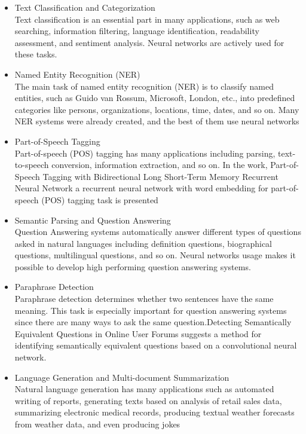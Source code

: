 \documentclass[12pt]{report}
\begin{document}
\begin{itemize}


\item  Text Classification and Categorization\\
Text classification is an essential part in many applications, such as web searching, information filtering, language identification, readability assessment, and sentiment analysis. Neural networks are actively used for these tasks.\\
\item Named Entity Recognition (NER)\\
The main task of named entity recognition (NER) is to classify named entities, such as Guido van Rossum, Microsoft, London, etc., into predefined categories like persons, organizations, locations, time, dates, and so on. Many NER systems were already created, and the best of them use neural networks\\
\item Part-of-Speech Tagging\\
Part-of-speech (POS) tagging has many applications including parsing, text-to-speech conversion, information extraction, and so on. In the work, Part-of-Speech Tagging with Bidirectional Long Short-Term Memory Recurrent Neural Network a recurrent neural network with word embedding for part-of-speech (POS) tagging task is presented \\
\item Semantic Parsing and Question Answering\\
Question Answering systems automatically answer different types of questions asked in natural languages including definition questions, biographical questions, multilingual questions, and so on. Neural networks usage makes it possible to develop high performing question answering systems.\\
\item  Paraphrase Detection\\
Paraphrase detection determines whether two sentences have the same meaning. This task is especially important for question answering systems since there are many ways to ask the same question.Detecting Semantically Equivalent Questions in Online User Forums suggests a method for identifying semantically equivalent questions based on a convolutional neural network.\\
\item  Language Generation and Multi-document Summarization\\
Natural language generation has many applications such as automated writing of reports, generating texts based on analysis of retail sales data, summarizing electronic medical records, producing textual weather forecasts from weather data, and even producing jokes\\

\end{itemize}
\end{document}
